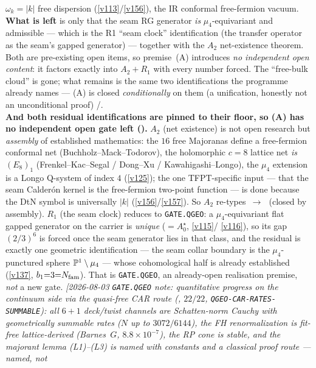 \begin{keybox}
$\omega_k{=}|k|$ free dispersion (\vref{v113}/\vref{v156}), the IR conformal free-fermion vacuum.
\textbf{What is left} is only that the seam RG generator \emph{is} $\mu_4$-equivariant and admissible ---
which is the R1 ``seam clock'' identification (the transfer operator as the seam's gapped generator) ---
together with the $A_2$ net-existence theorem. Both are pre-existing open items, so premise~(A) introduces
\emph{no independent open content}: it factors exactly into $A_2+R_1$ with every number forced. The
``free-bulk cloud'' is gone; what remains is the same two identifications the programme already names ---
(A) is closed \emph{conditionally} on them (a unification, honestly not an unconditional proof) \mE/\mO.
\smallskip\\
\noindent\textbf{And both residual identifications are pinned to their floor, so (A) has no independent open
gate left ().} $A_2$ (net existence) is not open research but
\emph{assembly} of established mathematics: the $16$ free Majoranas define a free-fermion conformal net
(Buchholz--Mack--Todorov), the holomorphic $c{=}8$ lattice net \emph{is} $(E_8)_1$ (Frenkel--Kac--Segal /
Dong--Xu / Kawahigashi--Longo), the $\mu_4$ extension is a Longo Q-system of index $4$ (\vref{v125}); the
one TFPT-specific input --- that the seam Calder\'on kernel is the free-fermion two-point function --- is
done because the DtN symbol is universally $|k|$ (\vref{v156}/\vref{v157}). So $A_2$ re-types
\mO$\,\to\,$\mC\ (closed by assembly). $R_1$ (the seam clock) reduces to \texttt{GATE.QGEO}: a
$\mu_4$-equivariant flat gapped generator on the carrier is \emph{unique} ($=A_0^\star$, \vref{v115}/%
\vref{v116}), so its gap $(2/3)^6$ is forced once the seam generator lies in that class, and the residual is
exactly one geometric identification --- the seam collar boundary is the $\mu_4$-punctured sphere
$\mathbb P^1\setminus\mu_4$ --- whose cohomological half is already established (\vref{v137},
$b_1{=}3{=}N_{\mathrm{fam}}$). That is \texttt{GATE.QGEO}, an already-open realisation premise, \emph{not} a new gate.
\emph{[2026-08-03 \texttt{GATE.QGEO} note: quantitative progress on the continuum side via the quasi-free
CAR route (, $22/22$, \texttt{QGEO-CAR-RATES-SUMMABLE}): all $6{+}1$
deck/twist channels are Schatten-norm Cauchy with geometrically summable rates ($N$ up to $3072/6144$), the
FH renormalization is fit-free lattice-derived (Barnes~$G$, $8.8\times10^{-7}$), the RP cone is stable, and
the majorant lemma (L1)--(L3) is \emph{named} with constants and a classical proof route --- named, not
}
\end{keybox}
